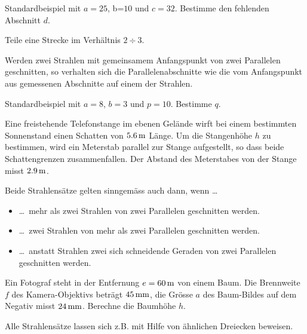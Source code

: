 \documentclass[%
11pt,%
twoside,%
titlepage,%
a4page,%
headsepline%
]{scrartcl}
\begin{document}
\begin{bsp}
Standardbeispiel mit $a=25$, b=$10$ und $c=32$. Bestimme den fehlenden Abschnitt $d$.%
\end{bsp}

\begin{ueb}
Teile eine Strecke im Verh\"altnis $2\div3$.
\end{ueb}

\begin{satz}[2. Strahlensatz]
Werden zwei Strahlen mit gemeinsamem Anfangspunkt von zwei Parallelen geschnitten, so verhalten sich die Parallelenabschnitte wie die vom Anfangspunkt aus gemessenen Abschnitte auf einem der Strahlen.%
\end{satz}

\begin{bsp}
Standardbeispiel mit $a=8$, $b=3$ und $p=10$. Bestimme $q$.%
\end{bsp}

\begin{ueb}
Eine freistehende Telefonstange im ebenen Gel\"ande wirft bei einem bestimmten Sonnenstand einen Schatten von $\unit[5.6]{m}$ L\"ange. Um die Stangenh\"ohe $h$ zu bestimmen, wird ein Meterstab parallel zur Stange aufgestellt, so dass beide Schattengrenzen zusammenfallen. Der Abstand des Meterstabes von der Stange misst $\unit[2.9]{m}$.
\end{ueb}

Beide Strahlens\"atze gelten sinngem\"ass auch dann, wenn \dots
\begin{itemize}
\item \dots\ mehr als zwei Strahlen von zwei Parallelen geschnitten werden.
\item \dots\ zwei Strahlen von mehr als zwei Parallelen geschnitten werden.
\item \dots\ anstatt Strahlen zwei sich schneidende Geraden von zwei Parallelen geschnitten werden.
\end{itemize}

\begin{bsp}
Ein Fotograf steht in der Entfernung $e=\unit[60]{m}$ von einem Baum. Die Brennweite $f$ des Kamera-Objektivs betr\"agt $\unit[45]{mm}$, die Gr\"osse $a$ des Baum-Bildes auf dem Negativ misst $\unit[24]{mm}$. Berechne die Baumh\"ohe $h$.%
\end{bsp}
Alle Strahlens\"atze lassen sich z.B. mit Hilfe von \"ahnlichen Dreiecken beweisen.
\end{document}
